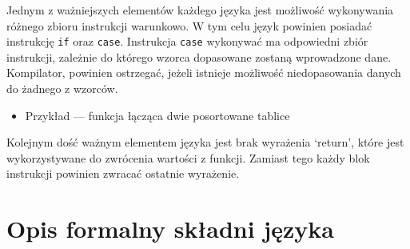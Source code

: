 \documentclass[a4paper,12pt]{book} %
\begin{document}

\newpage



\newpage
Jednym z ważniejszych elementów każdego języka jest możliwość wykonywania różnego zbioru instrukcji warunkowo. W tym celu język powinien posiadać instrukcję \lstinline$if$ oraz \lstinline$case$. Instrukcja \lstinline$case$ wykonywać ma odpowiedni zbiór instrukcji, zależnie do którego wzorca dopasowane zostaną wprowadzone dane. Kompilator, powinien ostrzegać, jeżeli istnieje możliwość niedopasowania danych do żadnego z wzorców.

\begin{itemize}
  
  \item Przykład --- funkcja łącząca dwie posortowane tablice
        \newpage
        
\end{itemize}

\newpage
Kolejnym dość ważnym elementem języka jest brak wyrażenia `return', które jest wykorzystywane do zwrócenia wartości z funkcji. Zamiast tego każdy blok instrukcji powinien zwracać ostatnie wyrażenie.






\section{Opis formalny składni języka}
\end{document}
